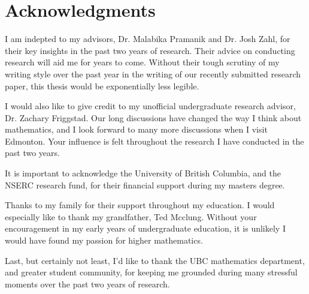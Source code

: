 
\chapter{Acknowledgments}

I am indepted to my advisors, Dr. Malabika Pramanik and Dr. Josh Zahl, for their key insights in the past two years of research. Their advice on conducting research will aid me for years to come. Without their tough scrutiny of my writing style over the past year in the writing of our recently submitted research paper, this thesis would be exponentially less legible.

I would also like to give credit to my unofficial undergraduate research advisor, Dr. Zachary Friggstad. Our long discussions have changed the way I think about mathematics, and I look forward to many more discussions when I visit Edmonton. Your influence is felt throughout the research I have conducted in the past two years.

It is important to acknowledge the University of British Columbia, and the NSERC research fund, for their financial support during my masters degree.

Thanks to my family for their support throughout my education. I would especially like to thank my grandfather, Ted Mcclung. Without your encouragement in my early years of undergraduate education, it is unlikely I would have found my passion for higher mathematics.

Last, but certainly not least, I'd like to thank the UBC mathematics department, and greater student community, for keeping me grounded during many stressful moments over the past two years of research.